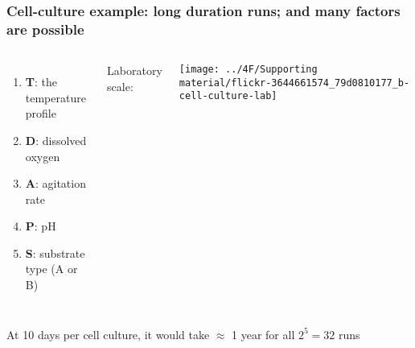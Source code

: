 \begin{frame}\frametitle{Cell-culture example: long duration runs; and many factors are possible}
	\begin{columns}[c]
			\begin{enumerate}
				\item	\textbf{T}: the temperature profile
				\item	\textbf{D}: dissolved oxygen
				\item	\textbf{A}: agitation rate
				\item	\textbf{P}: pH
				\item	\textbf{S}: substrate type (A or B)
			\end{enumerate}
		
			{\color{blue} \small Laboratory scale:} 
			
			\vspace{0.2cm}
			
			\centerline{\texttt{[image: ../4F/Supporting material/flickr-3644661574\_79d0810177\_b-cell-culture-lab]}}
	\end{columns}

	\vfill
	At 10 days per cell culture, it would take $\approx$ 1 year for all $2^5 = 32$ runs
	
\end{frame}

